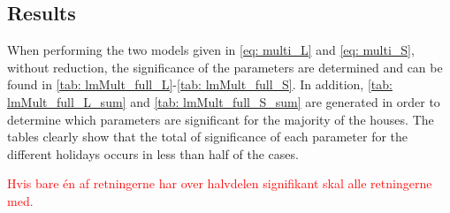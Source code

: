 

\subsection{Results}
\noindent When performing the two models given in \cref{eq: multi_L} and \cref{eq: multi_S}, without reduction, the significance of the parameters are determined and can be found in \cref{tab: lmMult_full_L}-\ref{tab: lmMult_full_S}. In addition, \cref{tab: lmMult_full_L_sum} and \cref{tab: lmMult_full_S_sum} are generated in order to determine which parameters are significant for the majority of the houses. The tables clearly show that the total of significance of each parameter for the different holidays occurs in less than half of the cases.

\textcolor{red}{Hvis bare én af retningerne har over halvdelen signifikant skal alle retningerne med.}

